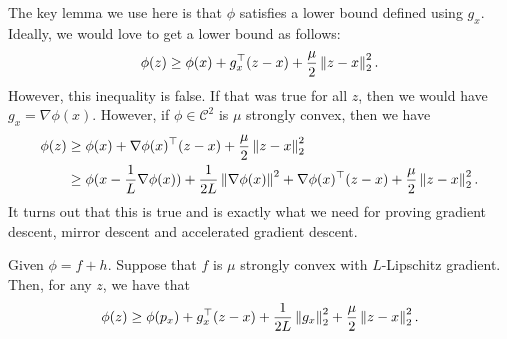 The key lemma we use here is that $\phi$ satisfies a lower bound
defined using $g_{x}$. Ideally, we would love to get a lower bound
as follows:
\[
\phi(z)\geq\phi(x)+g^{\top}_{x}(z-x)+\frac{\mu}{2}\left\Vert z-x\right\Vert^{2}_{2}.
\]
However, this inequality is false. If that was true for all $z$,
then we would have $g_{x}=\nabla\phi(x)$. However, if $\phi\in\mathcal{C}^{2}$
is $\mu$ strongly convex, then we have
\begin{align}
\phi(z) & \geq\phi(x)+\nabla\phi(x)^{\top}(z-x)+\frac{\mu}{2}\left\Vert z-x\right\Vert^{2}_{2}\nonumber \\
 & \geq\phi(x-\frac{1}{L}\nabla\phi(x))+\frac{1}{2L}\left\Vert \nabla\phi(x)\right\Vert^{2}+\nabla\phi(x)^{\top}(z-x)+\frac{\mu}{2}\left\Vert z-x\right\Vert^{2}_{2}.\label{eq:gradient_lower_bound}
\end{align}
It turns out that this is true and is exactly what we need for proving
gradient descent, mirror descent and accelerated gradient descent.
\begin{thm}
\label{thm:gradient_mapping_lower_bound}Given $\phi=f+h$. Suppose
that $f$ is $\mu$ strongly convex with $L$-Lipschitz gradient.
Then, for any $z$, we have that
\[
\phi(z)\geq\phi(p_{x})+g^{\top}_{x}(z-x)+\frac{1}{2L}\left\Vert g_{x}\right\Vert^{2}_{2}+\frac{\mu}{2}\left\Vert z-x\right\Vert^{2}_{2}.
\]
\end{thm}

